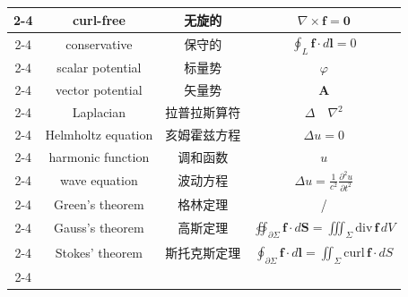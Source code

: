 \documentclass{article}
\begin{document}
\begin{longtable}{|c|c|c|c|}
    \cline{2-4}
    & curl-free & 无旋的 & $\nabla \times \boldsymbol{f} = \boldsymbol{0}$ \\
    \cline{2-4}
    & conservative & 保守的 & $\oint_{L}\boldsymbol{f}\cdot d\boldsymbol{l} = 0$ \\
    \cline{2-4}
    & scalar potential & 标量势 & $\varphi$ \\
    \cline{2-4}
    & vector potential & 矢量势 & $\boldsymbol{A}$ \\
    \cline{2-4}
    & Laplacian & 拉普拉斯算符 & $\Delta \quad \nabla^2$ \\
    \cline{2-4}
    & Helmholtz equation & 亥姆霍兹方程 & $\Delta u = 0$ \\
    \cline{2-4}
    & harmonic function & 调和函数 & $u$ \\
    \cline{2-4}
    & wave equation & 波动方程 & $\Delta u = \frac{1}{c^2}\frac{\partial^2 u}{\partial t^2}$ \\
    \cline{2-4}
    & Green's theorem & 格林定理 & / \\
    \cline{2-4}
    & Gauss's theorem & 高斯定理 & $\oiint_{\partial \Sigma}\boldsymbol{f}\cdot d\boldsymbol{S}=\iiint_{\Sigma}\text{div}\, \boldsymbol{f}\,dV$ \\
    \cline{2-4}
    & Stokes' theorem & 斯托克斯定理 & $\oint_{\partial \Sigma}\boldsymbol{f}\cdot d\boldsymbol{l}=\iint_{\Sigma}\text{curl}\, \boldsymbol{f}\cdot dS$ \\
    \cline{2-4}
  \end{longtable}
\end{document}
